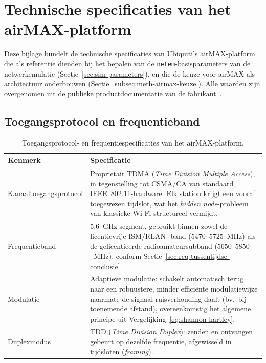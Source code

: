 \chapter{Technische specificaties van het airMAX-platform}%
\label{app:airmax-specs}

Deze bijlage bundelt de technische specificaties van Ubiquiti's airMAX-platform die als
referentie dienden bij het bepalen van de \texttt{netem}-basisparameters van de
netwerkemulatie (Sectie~\ref{sec:sim-parameters}), en die de keuze voor airMAX als
architectuur onderbouwen (Sectie~\ref{subsec:meth-airmax-keuze}). Alle waarden zijn
overgenomen uit de publieke productdocumentatie van de
fabrikant~\autocite{AirMaxTDMA,UISPGPSSync}.

\section{Toegangsprotocol en frequentieband}%
\label{sec:app-airmax-toegang}

\begin{table}[h]
  \centering
  \small
  \begin{tabular}{p{4.0cm}p{9.5cm}}
    \toprule
    \textbf{Kenmerk} & \textbf{Specificatie} \\
    \midrule
    Kanaaltoegangsprotocol & Proprietair TDMA (\textit{Time Division Multiple Access}),
      in tegenstelling tot CSMA/CA van standaard IEEE~802.11-hardware. Elk station
      krijgt een vooraf toegewezen tijdslot, wat het \textit{hidden node}-probleem van
      klassieke Wi-Fi structureel vermijdt. \\
    Frequentieband & 5.6~GHz-segment, gebruikt binnen zowel de licentievrije ISM/RLAN-
      band ($5470$--$5725$~MHz) als de gelicentieerde radioamateursubband
      ($5650$--$5850$~MHz), conform Sectie~\ref{sec:req-tussentijdse-conclusie}. \\
    Modulatie & Adaptieve modulatie: schakelt automatisch terug naar een robuustere,
      minder efficiënte modulatiewijze naarmate de signaal-ruisverhouding daalt (bv.\
      bij toenemende afstand), overeenkomstig het algemene principe uit
      Vergelijking~\eqref{eq:shannon-hartley}. \\
    Duplexmodus & TDD (\textit{Time Division Duplex}): zenden en ontvangen gebeurt op
      dezelfde frequentie, afgewisseld in tijdsloten (\textit{framing}). \\
    \bottomrule
  \end{tabular}
  \caption{Toegangsprotocol- en frequentiespecificaties van het airMAX-platform.}
  \label{tab:app-airmax-toegang}
\end{table}

